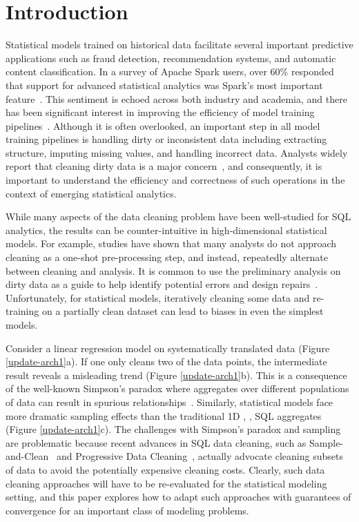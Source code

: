 \section{Introduction}\label{intro}
Statistical models trained on historical data facilitate several important predictive applications such as fraud detection, recommendation systems, and automatic content classification.
In a survey of Apache Spark users, over 60\% responded that support for advanced statistical analytics was Spark's most important feature~\cite{sparksurvey}.
This sentiment is echoed across both industry and academia, and there has been significant interest in improving the efficiency of model training pipelines~\cite{bdas, alexandrov2014stratosphere, crotty2014tupleware, tensor}. 
Although it is often overlooked, an important step in all model training pipelines is handling dirty or inconsistent data including extracting structure, imputing missing values, and handling incorrect data.
Analysts widely report that cleaning dirty data is a major concern~\cite{kandel2012,nytimes}, and consequently, it is important to understand the efficiency and correctness of such operations in the context of emerging statistical analytics.

While many aspects of the data cleaning problem have been well-studied for SQL analytics, the results can be counter-intuitive in high-dimensional statistical models.
For example, studies have shown that many analysts do not approach cleaning as a one-shot pre-processing step, and instead, repeatedly alternate between cleaning and analysis.
It is common to use the preliminary analysis on dirty data as a guide to help identify potential errors and design repairs~\cite{kandel2012}.
Unfortunately, for statistical models, iteratively cleaning some data and re-training on a partially clean dataset can lead to biases in even the simplest models.

Consider a linear regression model on systematically translated data (Figure \ref{update-arch1}a).
If one only cleans two of the data points, the intermediate result reveals a misleading trend (Figure \ref{update-arch1}b).
This is a consequence of the well-known Simpson's paradox where aggregates over different populations of data can result in spurious relationships~\cite{simpson1951interpretation}. 
Similarly, statistical models face more dramatic sampling effects than the traditional 1D  \sumfunc, \countfunc, \avgfunc SQL aggregates (Figure \ref{update-arch1}c).
The challenges with Simpson's paradox and sampling are problematic because recent advances in SQL data cleaning, such as Sample-and-Clean~\cite{wang1999sample} and Progressive Data Cleaning~\cite{altowim2014progressive, papenbrock2015progressive, DBLP:journals/pvldb/YakoutENOI11}, actually advocate cleaning subsets of data to avoid the potentially expensive cleaning costs.
Clearly, such data cleaning approaches will have to be re-evaluated for the statistical modeling setting, and this paper explores how to adapt such approaches with guarantees of convergence for an important class of modeling problems. 

